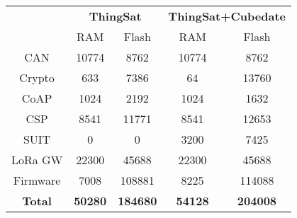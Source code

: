 \documentclass{standalone}
\begin{document}
\begin{tabular}{ccccc}
\hline
               & \multicolumn{2}{c}{\textbf{ThingSat}} & \multicolumn{2}{c}{\textbf{ThingSat+Cubedate}} \\
               & RAM               & Flash             & RAM               & Flash             \\ \hline
CAN            & 10774             & 8762              & 10774             & 8762              \\
Crypto         & 633               & 7386              & 64                & 13760             \\
CoAP           & 1024              & 2192              & 1024              & 1632              \\
CSP            & 8541              & 11771             & 8541              & 12653             \\
SUIT           & 0                 & 0                 & 3200              & 7425              \\
LoRa GW        & 22300             & 45688             & 22300             & 45688             \\
Firmware       & 7008              & 108881            & 8225              & 114088            \\ \hline
\textbf{Total} & \textbf{50280}    & \textbf{184680}   & \textbf{54128}    & \textbf{204008}   \\ \hline
\end{tabular}%
\end{document}
